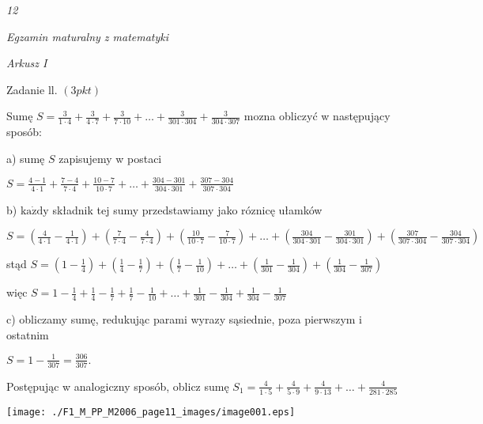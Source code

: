 \documentclass[a4paper,12pt]{article}
\begin{document}
{\it 12}

{\it Egzamin maturalny z matematyki}

{\it Arkusz I}

Zadanie ll. $(3pkt)$

Sumę $S=\displaystyle \frac{3}{1\cdot 4}+\frac{3}{4\cdot 7}+\frac{3}{7\cdot 10}+\ldots+\frac{3}{301\cdot 304}+\frac{3}{304\cdot 307}$ mozna obliczyć w następujący sposób:

a) sumę $S$ zapisujemy w postaci

$S=\displaystyle \frac{4-1}{4\cdot 1}+\frac{7-4}{7\cdot 4}+\frac{10-7}{10\cdot 7}+\ldots+\frac{304-301}{304\cdot 301}+\frac{307-304}{307\cdot 304}$

b) $\mathrm{k}\mathrm{a}\dot{\mathrm{z}}\mathrm{d}\mathrm{y}$ składnik tej sumy przedstawiamy jako róznicę ułamków

$S=(\displaystyle \frac{4}{4\cdot 1}-\frac{1}{4\cdot 1})+(\frac{7}{7\cdot 4}-\frac{4}{7\cdot 4})+(\frac{10}{10\cdot 7}-\frac{7}{10\cdot 7})+\ldots+(\frac{304}{304\cdot 301}-\frac{301}{304\cdot 301})+(\frac{307}{307\cdot 304}-\frac{304}{307\cdot 304})$

stąd $S=(1-\displaystyle \frac{1}{4})+(\frac{1}{4}-\frac{1}{7})+(\frac{1}{7}-\frac{1}{10})+\ldots+(\frac{1}{301}-\frac{1}{304})+(\frac{1}{304}-\frac{1}{307})$

więc $S=1-\displaystyle \frac{1}{4}+\frac{1}{4}-\frac{1}{7}+\frac{1}{7}-\frac{1}{10}+\ldots+\frac{1}{301}-\frac{1}{304}+\frac{1}{304}-\frac{1}{307}$

c) obliczamy sumę, redukując parami wyrazy sąsiednie, poza pierwszym i ostatnim

$S=1-\displaystyle \frac{1}{307}=\frac{306}{307}.$

Postępując w analogiczny sposób, oblicz sumę $S_{1}=\displaystyle \frac{4}{1\cdot 5}+\frac{4}{5\cdot 9}+\frac{4}{9\cdot 13}+\ldots+\frac{4}{281\cdot 285}$
\begin{center}
\texttt{[image: ./F1\_M\_PP\_M2006\_page11\_images/image001.eps]}
\end{center}
\end{document}
